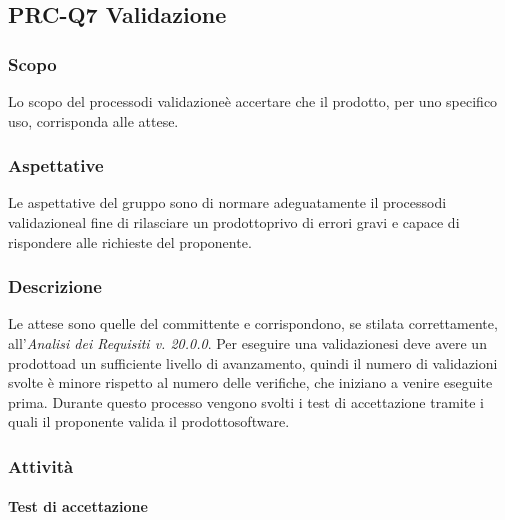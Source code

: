 \subsection{PRC-Q7 Validazione}

	\subsubsection{Scopo}
	Lo scopo del processo\glosp di validazione\glosp è accertare che il prodotto\glo, per uno specifico uso, corrisponda alle attese.
	
	\subsubsection{Aspettative}
	Le aspettative del gruppo sono di normare adeguatamente il processo\glosp di validazione\glosp al fine di rilasciare un prodotto\glosp privo di errori gravi e capace di rispondere alle richieste del proponente.
	
	\subsubsection{Descrizione}
	Le attese sono quelle del committente e corrispondono, se stilata correttamente, all'\textit{Analisi dei Requisiti v. 20.0.0}. 
	Per eseguire una validazione\glosp si deve avere un prodotto\glosp ad un sufficiente livello di avanzamento, quindi il numero di validazioni svolte è minore rispetto al numero delle verifiche, che iniziano a venire eseguite prima.
	Durante questo processo vengono svolti i test di accettazione tramite i quali il proponente valida il prodotto\glosp software.
	
	\subsubsection{Attività}
		\paragraph{Test di accettazione}
